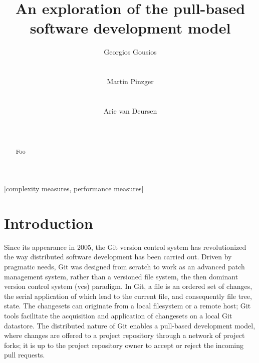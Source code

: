 \documentclass{sig-alternate}
\begin{document}
\newcommand{\todo}[1]{\textbf{TODO}\footnote{\textbf{TODO:} #1}}


\title{An exploration of the pull-based software development model}

\author{
\alignauthor
Georgios Gousios\\
       \\
       \\
\alignauthor
Martin Pinzger\\
       \\
       \\
\alignauthor
Arie van Deursen\\
       \\
       \\       
}

\maketitle

\begin{abstract}
Foo
\end{abstract}

[complexity measures, performance measures]



\section{Introduction}

Since its appearance in 2005, the Git version control system has revolutionized
the way distributed software development has been carried out. Driven by
pragmatic needs, Git was designed from scratch to work as an advanced patch
management system, rather than a versioned file system, the then dominant
version control system ({\sc vcs}) paradigm. In Git, a file is an ordered set of
changes, the serial application of which lead to the current file, and
consequently file tree, state. The changesets can originate from a local
filesystem or a remote host; Git tools facilitate the acquisition and
application of changesets on a local Git datastore. The distributed nature
of Git enables a pull-based development model, where changes are offered
to a project repository through a network of project forks; it is up to the
project repository owner to accept or reject the incoming pull requests.
\end{document}
